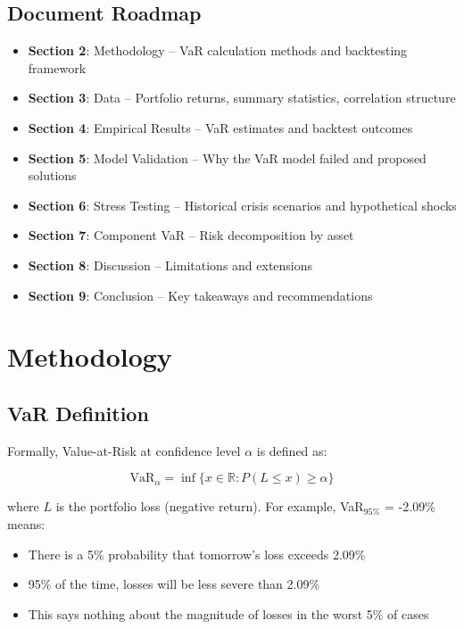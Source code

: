 \documentclass[12pt,a4paper]{article}
\begin{document}
\subsection{Document Roadmap}

\begin{itemize}
    \item \textbf{Section 2}: Methodology – VaR calculation methods and backtesting framework
    \item \textbf{Section 3}: Data – Portfolio returns, summary statistics, correlation structure
    \item \textbf{Section 4}: Empirical Results – VaR estimates and backtest outcomes
    \item \textbf{Section 5}: Model Validation – Why the VaR model failed and proposed solutions
    \item \textbf{Section 6}: Stress Testing – Historical crisis scenarios and hypothetical shocks
    \item \textbf{Section 7}: Component VaR – Risk decomposition by asset
    \item \textbf{Section 8}: Discussion – Limitations and extensions
    \item \textbf{Section 9}: Conclusion – Key takeaways and recommendations
\end{itemize}

\newpage
\section{Methodology}

\subsection{VaR Definition}

Formally, Value-at-Risk at confidence level $\alpha$ is defined as:

\begin{equation}
\text{VaR}_\alpha = \inf \{ x \in \mathbb{R} : P(L \leq x) \geq \alpha \}
\end{equation}

where $L$ is the portfolio loss (negative return). For example, VaR$_{95\%}$ = -2.09\% means:
\begin{itemize}
    \item There is a 5\% probability that tomorrow's loss exceeds 2.09\%
    \item 95\% of the time, losses will be less severe than 2.09\%
    \item This says nothing about the magnitude of losses in the worst 5\% of cases
\end{itemize}
\end{document}
